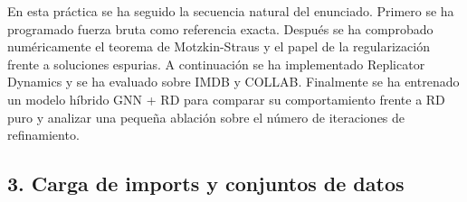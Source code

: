 \documentclass[11pt]{article}
\begin{document}
En esta práctica se ha seguido la secuencia natural del enunciado.
Primero se ha programado fuerza bruta como referencia exacta. Después se
ha comprobado numéricamente el teorema de Motzkin-Straus y el papel de
la regularización frente a soluciones espurias. A continuación se ha
implementado Replicator Dynamics y se ha evaluado sobre IMDB y COLLAB.
Finalmente se ha entrenado un modelo híbrido GNN + RD para comparar su
comportamiento frente a RD puro y analizar una pequeña ablación sobre el
número de iteraciones de refinamiento.

    \subsection{3. Carga de imports y conjuntos de
datos}\label{carga-de-imports-y-conjuntos-de-datos}
\end{document}
